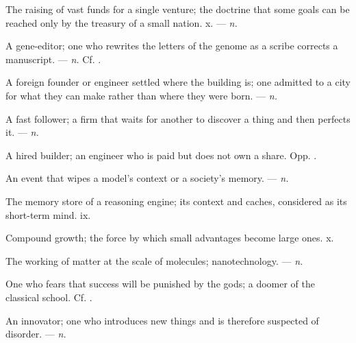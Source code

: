  The raising of vast funds for a single venture; the doctrine that some goals can be reached only by the treasury of a small nation.   x. ---  \textit{n.}

 A gene-editor; one who rewrites the letters of the genome as a scribe corrects a manuscript. ---  \textit{n.} Cf. .

 A foreign founder or engineer settled where the building is; one admitted to a city for what they can make rather than where they were born. ---  \textit{n.}

 A fast follower; a firm that waits for another to discover a thing and then perfects it. ---  \textit{n.}

 A hired builder; an engineer who is paid but does not own a share. Opp. .

 An event that wipes a model's context or a society's memory. ---  \textit{n.}

 The memory store of a reasoning engine; its context and caches, considered as its short-term mind.   ix.

 Compound growth; the force by which small advantages become large ones.   x.

 The working of matter at the scale of molecules; nanotechnology. ---  \textit{n.}

 One who fears that success will be punished by the gods; a doomer of the classical school. Cf. .

 An innovator; one who introduces new things and is therefore suspected of disorder. ---  \textit{n.}

